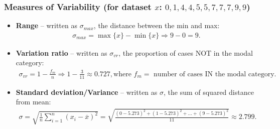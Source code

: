 \documentclass[aspectratio=169]{beamer}
\theoremstyle{principle}
\begin{document}
\begin{frame}
\frametitle{Measures of Variability (for dataset $x$: $0, 1, 4, 4, 5, 5, 7, 7, 7, 9, 9$)}
\begin{itemize}

\item \textbf{Range} -- written as $\sigma_{max}$, the distance between the min and max: 
\begin{align*}
\sigma_{max} = \max\{x\} - \min\{x\} \Longrightarrow 9 - 0 = 9.
\end{align*}

\item[]\color{white} \textbf{Variation ratio} -- written as $\sigma_{vr}$, the proportion of cases NOT in the modal category:
\begin{align*}
\sigma_{vr} = 1 - \frac{f_m}{n}\Longrightarrow 1 - \frac{3}{11} \approx 0.727, \mbox{where  }f_m =\mbox{ number of cases IN the modal category}.
\end{align*}

\item[]\color{white} \textbf{Standard deviation/Variance} -- written as $\sigma$, the sum of squared distance from mean:
\begin{align*}
\sigma = \sqrt{\frac{1}{n}\sum_{i=1}^n(x_i - \overline{x})^2} = \sqrt{\frac{(0 - 5.273)^2 + (1 - 5.273)^2 + \hdots + (9 - 5.273)^2}{11}}\approx 2.799.
\end{align*}

\end{itemize}
\end{frame}
\end{document}
